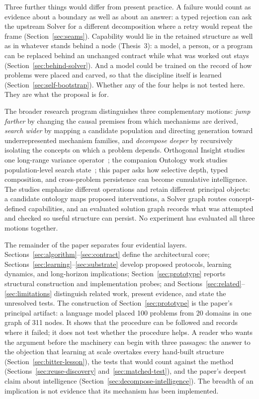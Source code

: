 \documentclass[11pt]{article}
\begin{document}
Three further things would differ from present practice. A failure would count as evidence about a boundary as well as about an answer: a typed rejection can ask the upstream Solver for a different decomposition where a retry would repeat the frame (Section~\ref{sec:seams}). Capability would lie in the retained structure as well as in whatever stands behind a node (Thesis~3): a model, a person, or a program can be replaced behind an unchanged contract while what was worked out stays (Section~\ref{sec:behind-solver}). And a model could be trained on the record of how problems were placed and carved, so that the discipline itself is learned (Section~\ref{sec:self-bootstrap}). Whether any of the four helps is not tested here. They are what the proposal is for.

The broader research program distinguishes three complementary motions: \emph{jump farther} by changing the causal premises from which mechanisms are derived, \emph{search wider} by mapping a candidate population and directing generation toward underrepresented mechanism families, and \emph{decompose deeper} by recursively isolating the concepts on which a problem depends. Orthogonal Insight studies one long-range variance operator~\cite{westerberg2025strangeworlds}; the companion Ontology work studies population-level search state~\cite{westerberg2026ontology}; this paper asks how selective depth, typed composition, and cross-problem persistence can become cumulative intelligence. The studies emphasize different operations and retain different principal objects: a candidate ontology maps proposed interventions, a Solver graph routes concept-defined capabilities, and an evaluated solution graph records what was attempted and checked so useful structure can persist. No experiment has evaluated all three motions together.

The remainder of the paper separates four evidential layers. Sections~\ref{sec:algorithm}--\ref{sec:contract} define the architectural core; Sections~\ref{sec:learning}--\ref{sec:substrate} develop proposed protocols, learning dynamics, and long-horizon implications; Section~\ref{sec:prototype} reports structural construction and implementation probes; and Sections~\ref{sec:related}--\ref{sec:limitations} distinguish related work, present evidence, and state the unresolved tests. The construction of Section~\ref{sec:prototype} is the paper's principal artifact: a language model placed 100 problems from 20 domains in one graph of 311 nodes. It shows that the procedure can be followed and records where it failed; it does not test whether the procedure helps. A reader who wants the argument before the machinery can begin with three passages: the answer to the objection that learning at scale overtakes every hand-built structure (Section~\ref{sec:bitter-lesson}), the tests that would count against the method (Sections~\ref{sec:reuse-discovery} and~\ref{sec:matched-test}), and the paper's deepest claim about intelligence (Section~\ref{sec:decompose-intelligence}). The breadth of an implication is not evidence that its mechanism has been implemented.
\end{document}
